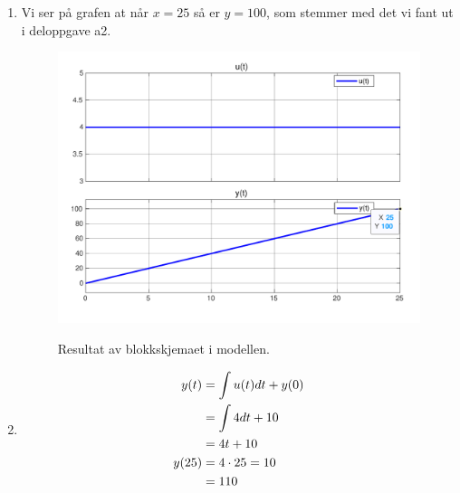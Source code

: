 \documentclass[answers,11pt]{exam}
\begin{document}
\begin{enumerate}[label=\alph*)]
\begin{tcolorbox}
\begin{enumerate}[label=a\arabic*)]
      \item
            Vi ser på grafen at når $x=25$ så er $y=100$, som stemmer med det
            vi fant
            ut i deloppgave a2.
            \begin{figure}[H]
              \centering
              \hspace*{0mm}\scalebox{0.65}
              {\includegraphics{figurer/a3.pdf}}
              \caption{Resultat av blokkskjemaet i modellen.
                \label{fig:2a1}}
            \end{figure}

      \item
            \begin{align}
              y(t)  & = \int u(t) dt + y(0) \notag \\
                    & = \int 4dt +10 \notag        \\
                    & = 4 t + 10 \notag            \\
              y(25) & = 4 \cdot 25 = 10\notag      \\
                    & = 110
            \end{align}


\end{enumerate}
\end{tcolorbox}
\end{enumerate}
\end{document}
